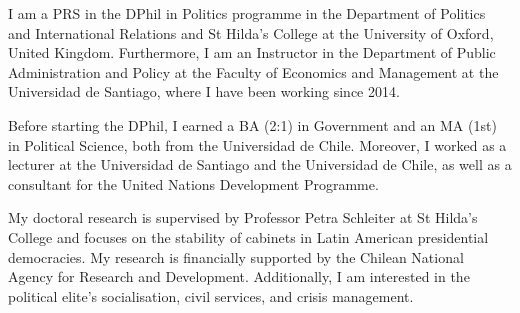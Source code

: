 




\vspace{3mm}

\begin{cvparagraph}

I am a PRS in the DPhil in Politics programme in the Department of Politics and International Relations and St Hilda’s College at the University of Oxford, United Kingdom. Furthermore, I am an Instructor in the Department of Public Administration and Policy at the Faculty of Economics and Management at the Universidad de Santiago, where I have been working since 2014.

Before starting the DPhil, I earned a BA (2:1) in Government and an MA (1st) in Political Science, both from the Universidad de Chile. Moreover, I worked as a lecturer at the Universidad de Santiago and the Universidad de Chile, as well as a consultant for the United Nations Development Programme.

My doctoral research is supervised by Professor Petra Schleiter at St Hilda’s College and focuses on the stability of cabinets in Latin American presidential democracies. My research is financially supported by the Chilean National Agency for Research and Development. Additionally, I am interested in the political elite’s socialisation, civil services, and crisis management.
\vspace{1mm}
\end{cvparagraph}
